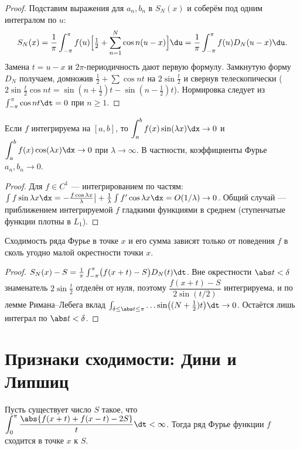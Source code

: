 \begin{proof}
Подставим выражения для $a_n,b_n$ в $S_N(x)$ и соберём под одним интегралом по $u$:
\[
  S_N(x)=\frac1\pi\int_{-\pi}^{\pi}f(u)\Bigl[\tfrac12+\sum_{n=1}^N\cos n(u-x)\Bigr]\du
   =\frac1\pi\int_{-\pi}^{\pi}f(u)D_N(u-x)\du .
\]
Замена $t=u-x$ и $2\pi$-периодичность дают первую формулу. Замкнутую форму $D_N$ получаем,
домножив $\tfrac12+\sum\cos nt$ на $2\sin\tfrac t2$ и свернув телескопически
($2\sin\tfrac t2\cos nt=\sin(n+\tfrac12)t-\sin(n-\tfrac12)t$). Нормировка следует из
$\int_{-\pi}^{\pi}\cos nt\dt=0$ при $n\ge1$.
\end{proof}

\begin{lemma}
Если $f$ интегрируема на $[a,b]$, то
$\displaystyle\int_a^b f(x)\sin(\lambda x)\dx\to0$ и $\displaystyle\int_a^b f(x)\cos(\lambda x)\dx\to0$
при $\lambda\to\infty$. В частности, коэффициенты Фурье $a_n,b_n\to0$.
\end{lemma}

\begin{proof}
Для $f\in C^1$ — интегрированием по частям: $\int f\sin\lambda x\dx
=-\tfrac{f\cos\lambda x}{\lambda}\big|+\tfrac1\lambda\int f'\cos\lambda x\dx=O(1/\lambda)\to0$.
Общий случай — приближением интегрируемой $f$ гладкими функциями в среднем (ступенчатые функции
плотны в $L_1$).
\end{proof}

\begin{theorem}
Сходимость ряда Фурье в точке $x$ и его сумма зависят только от поведения $f$ в сколь угодно малой
окрестности точки $x$.
\end{theorem}

\begin{proof}
$S_N(x)-S=\tfrac1\pi\int_{-\pi}^{\pi}\bigl(f(x+t)-S\bigr)D_N(t)\dt$. Вне окрестности $\abs t<\delta$
знаменатель $2\sin\tfrac t2$ отделён от нуля, поэтому
$\dfrac{f(x+t)-S}{2\sin(t/2)}$ интегрируема, и по лемме Римана--Лебега вклад
$\int_{\delta\le\abs t\le\pi}\dots\sin\bigl((N+\tfrac12)t\bigr)\dt\to0$. Остаётся лишь интеграл по
$\abs t<\delta$.
\end{proof}

\section{Признаки сходимости: Дини и Липшиц}

\begin{theorem}
Пусть существует число $S$ такое, что
$\displaystyle\int_0^{\pi}\frac{\abs{f(x+t)+f(x-t)-2S}}{t}\dt<\infty$.
Тогда ряд Фурье функции $f$ сходится в точке $x$ к $S$.
\end{theorem}

